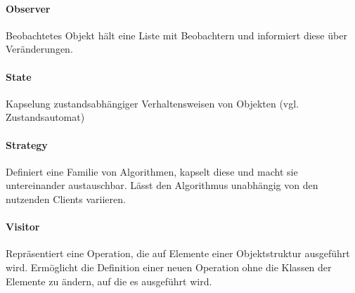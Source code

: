 \paragraph{Observer}\label{observer}

Beobachtetes Objekt hält eine Liste mit Beobachtern und informiert diese über
Veränderungen.

\paragraph{State}\label{state}

Kapselung zustandsabhängiger Verhaltensweisen von Objekten (vgl.
Zustandsautomat)

\paragraph{Strategy}\label{strategy}

Definiert eine Familie von Algorithmen, kapselt diese und macht sie
untereinander austauschbar. Lässt den Algorithmus unabhängig von den nutzenden
Clients variieren.


%

\paragraph{Visitor}\label{visitor}

Repräsentiert eine Operation, die auf Elemente einer Objektstruktur ausgeführt
wird. Ermöglicht die Definition einer neuen Operation ohne die Klassen der
Elemente zu ändern, auf die es ausgeführt wird.
